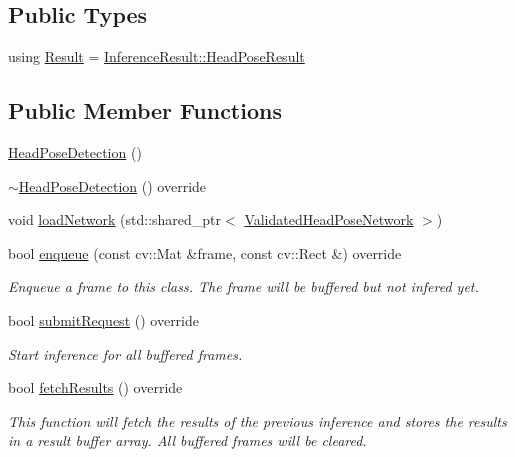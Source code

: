 \subsection*{Public Types}
\begin{DoxyCompactItemize}
\item 
using \hyperlink{classopenvino__service_1_1HeadPoseDetection_a2974bab186f80414217225d2f1fb6de9}{Result} = \hyperlink{structInferenceResult_1_1HeadPoseResult}{Inference\+Result\+::\+Head\+Pose\+Result}
\end{DoxyCompactItemize}
\subsection*{Public Member Functions}
\begin{DoxyCompactItemize}
\item 
\hyperlink{classopenvino__service_1_1HeadPoseDetection_abc430e5f6ae895d6bb4e34187f5fcd42}{Head\+Pose\+Detection} ()
\item 
\hyperlink{classopenvino__service_1_1HeadPoseDetection_a9fcba4b94c60854b54fcdde3fa839edd}{$\sim$\+Head\+Pose\+Detection} () override
\item 
void \hyperlink{classopenvino__service_1_1HeadPoseDetection_a8c4aa2573675e9fa4276b713d67b94eb}{load\+Network} (std\+::shared\+\_\+ptr$<$ \hyperlink{classValidatedHeadPoseNetwork}{Validated\+Head\+Pose\+Network} $>$)
\item 
bool \hyperlink{classopenvino__service_1_1HeadPoseDetection_a122807cd1add8980b21c76a9b9f1f300}{enqueue} (const cv\+::\+Mat \&frame, const cv\+::\+Rect \&) override
\begin{DoxyCompactList}\small\item\em Enqueue a frame to this class. The frame will be buffered but not infered yet. \end{DoxyCompactList}\item 
bool \hyperlink{classopenvino__service_1_1HeadPoseDetection_ac985e9d741eeacdd75467f9929aaf0f7}{submit\+Request} () override
\begin{DoxyCompactList}\small\item\em Start inference for all buffered frames. \end{DoxyCompactList}\item 
bool \hyperlink{classopenvino__service_1_1HeadPoseDetection_a252bfae15900a6d5936e742a418fe684}{fetch\+Results} () override
\begin{DoxyCompactList}\small\item\em This function will fetch the results of the previous inference and stores the results in a result buffer array. All buffered frames will be cleared. \end{DoxyCompactList}\item 

\end{DoxyCompactItemize}
